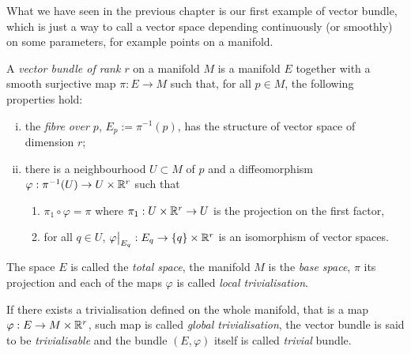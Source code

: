 What we have seen in the previous chapter is our first example of vector bundle, which is just a way to call a vector space depending continuously (or smoothly) on some parameters, for example points on a manifold.

\begin{definition}\label{def:vector_bundle}
  A \emph{vector bundle of rank $r$} on a manifold $M$ is a manifold $E$ together with a smooth surjective map $\pi : E \to M$ such that, for all $p\in M$, the following properties hold:
  \begin{enumerate}[(i)]
    \item the \emph{fibre over $p$}, $E_p := \pi^{-1}(p)$, has the structure of vector space of dimension $r$;
    \item there is a neighbourhood $U\subset M$ of $p$ and a diffeomorphism $\varphi: \pi^{-1}(U) \to U \times \mathbb{R}^r$ such that
          \begin{enumerate}
            \item $\pi_1 \circ \varphi = \pi$ where $\pi_1: U\times\mathbb{R}^r\to U$ is the projection on the first factor,
            \item for all $q\in U$, $\varphi\big|_{E_q} : E_q \to \{q\}\times \mathbb{R}^r$ is an isomorphism of vector spaces.
          \end{enumerate}
  \end{enumerate}

  The space $E$ is called the \emph{total space}, the manifold $M$ is the \emph{base space}, $\pi$ its projection and each of the maps $\varphi$ is called \emph{local trivialisation}.

  If there exists a trivialisation defined on the whole manifold, that is a map $\varphi: E \to M\times \mathbb{R}^r$, such map is called \emph{global trivialisation}, the vector bundle is said to be \emph{trivialisable} and the bundle $(E, \varphi)$ itself is called \emph{trivial} bundle.
\end{definition}

